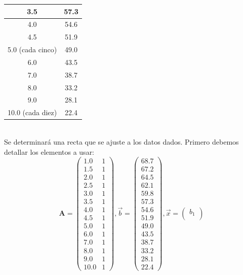 \documentclass[11pt]{article}
\theoremstyle{definition}
\begin{document}
\begin{enumerate}[(i)]
\begin{table}[ht]
\begin{tabular}{|c|c|}
3.5                & 57.3\\ \hline
4.0                 & 54.6\\ \hline
4.5                & 51.9\\ \hline
5.0 (cada cinco)  & 49.0\\ \hline
6.0               & 43.5\\ \hline
7.0                & 38.7\\ \hline
8.0              & 33.2\\ \hline
9.0                 & 28.1\\ \hline
10.0 (cada diez) & 22.4\\ \hline
\end{tabular}
\end{table}\\
Se determinar\'a una recta que se ajuste a los datos dados. Primero debemos detallar los elementos a usar:
\begin{equation*}
\textbf{A} =
\begin{pmatrix}
1.0 & 1\\
1.5 & 1\\
2.0 & 1\\
2.5 & 1\\
3.0 & 1\\
3.5 & 1\\
4.0 & 1\\
4.5 & 1\\
5.0 & 1\\
6.0 & 1\\
7.0 & 1\\
8.0 & 1\\
9.0 & 1\\
10.0 & 1
\end{pmatrix}, 
\vec{b} =
\begin{pmatrix}
68.7\\
67.2\\
64.5\\
62.1\\
59.8\\
57.3\\
54.6\\
51.9\\
49.0\\
43.5\\
38.7\\
33.2\\
28.1\\
22.4
\end{pmatrix}, 
\vec{x} =
\begin{pmatrix}
b_{1}\\

\end{pmatrix}
\end{equation*}
\end{enumerate}
\end{document}
